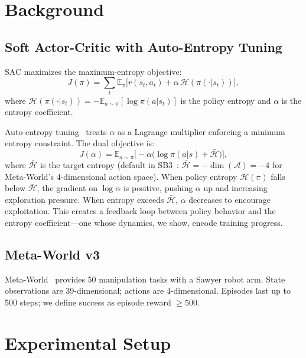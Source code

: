 \documentclass[twocolumn]{article}
\begin{document}
\section{Background}
\label{sec:background}

\subsection{Soft Actor-Critic with Auto-Entropy Tuning}

SAC maximizes the maximum-entropy objective:
\begin{equation}
  J(\pi) = \sum_t \mathbb{E}_{\pi} \bigl[ r(s_t, a_t) + \alpha\, \mathcal{H}(\pi(\cdot|s_t)) \bigr],
\end{equation}
where $\mathcal{H}(\pi(\cdot|s_t)) = -\mathbb{E}_{a \sim \pi}[\log \pi(a|s_t)]$
is the policy entropy and $\alpha$ is the entropy coefficient.

Auto-entropy tuning~\citep{haarnoja2018b} treats $\alpha$ as a Lagrange
multiplier enforcing a minimum entropy constraint. The dual objective is:
\begin{equation}
  J(\alpha) = \mathbb{E}_{a \sim \pi}\bigl[-\alpha \bigl(\log \pi(a|s) + \bar{\mathcal{H}}\bigr)\bigr],
\end{equation}
where $\bar{\mathcal{H}}$ is the target entropy (default in SB3~\citep{raffin2021}:
$\bar{\mathcal{H}} = -\dim(\mathcal{A}) = -4$ for Meta-World's 4-dimensional
action space). When policy entropy $\mathcal{H}(\pi)$ falls below $\bar{\mathcal{H}}$,
the gradient on $\log \alpha$ is positive, pushing $\alpha$ up and increasing
exploration pressure. When entropy exceeds $\bar{\mathcal{H}}$, $\alpha$
decreases to encourage exploitation. This creates a feedback loop between policy
behavior and the entropy coefficient---one whose dynamics, we show, encode
training progress.

\subsection{Meta-World v3}

Meta-World~\citep{yu2020} provides 50 manipulation tasks with a Sawyer robot
arm. State observations are 39-dimensional; actions are 4-dimensional. Episodes
last up to 500 steps; we define success as episode reward $\geq 500$.


\section{Experimental Setup}
\label{sec:setup}
\end{document}
